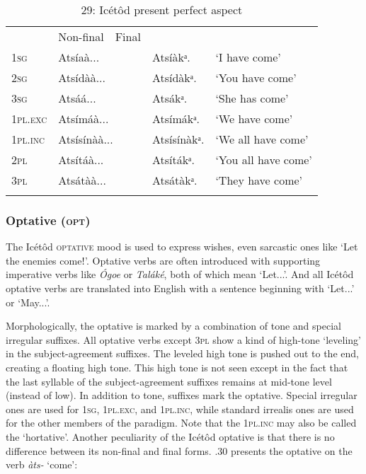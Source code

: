 \begin{table}
\caption{29: Icétôd present perfect aspect}
\label{tab:8}


\begin{tabularx}{\textwidth}{XXXXX}
\lsptoprule

\multicolumn{2}{X}{} & Non-final & Final & \\
\textsc{1sg} & \multicolumn{2}{X}{Atsíaà...} & Atsíàkᵃ. & ‘I have come’\\
\textsc{2sg} & \multicolumn{2}{X}{Atsídàà...} & Atsídàkᵃ. & ‘You have come’\\
\textsc{3sg} & \multicolumn{2}{X}{Atsáá...} & Atsákᵃ. & ‘She has come’\\
\textsc{1pl.exc} & \multicolumn{2}{X}{Atsímáà...} & Atsímákᵃ. & ‘We have come’\\
\textsc{1pl.inc} & \multicolumn{2}{X}{Atsísínàà...} & Atsísínàkᵃ. & ‘We all have come’\\
\textsc{2pl} & \multicolumn{2}{X}{Atsítáà...} & Atsítákᵃ. & ‘You all have come’\\
\textsc{3pl} & \multicolumn{2}{X}{Atsátàà...} & Atsátàkᵃ. & ‘They have come’\\
\lspbottomrule
\end{tabularx}
\end{table}

\subsubsection{Optative (\textsc{opt})}

The Icétôd \textsc{optative} mood is used to express wishes, even sarcastic ones like ‘Let the enemies comeǃ’. Optative verbs are often introduced with supporting imperative verbs like \textit{\'{O}goe} or \textit{Taláké}, both of which mean ‘Let...’. And all Icétôd optative verbs are translated into English with a sentence beginning with ‘Let...’ or ‘May...’. 

Morphologically, the optative is marked by a combination of tone and special irregular suffixes. All optative verbs except 3\textsc{pl} show a kind of high-tone ‘leveling’ in the subject-agreement suffixes. The leveled high tone is pushed out to the end, creating a floating high tone. This high tone is not seen except in the fact that the last syllable of the subject-agreement suffixes remains at mid-tone level (instead of low). In addition to tone, suffixes mark the optative. Special irregular ones are used for \textsc{1sg}, 1\textsc{pl.exc}, and 1\textsc{pl.inc}, while standard irrealis ones are used for the other members of the paradigm. Note that the 1\textsc{pl.inc} may also be called the ‘hortative’. Another peculiarity of the Icétôd optative is that there is no difference between its non-final and final forms. .30 presents the optative on the verb \textit{àts-} ‘come’:


